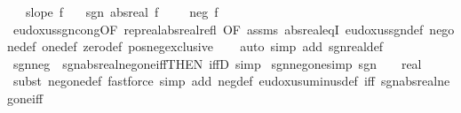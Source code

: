 \begin{isabellebody}
\ \ \ {\isachardoublequoteopen}slope\ f{\isachardoublequoteclose}\isanewline
\ \ \ {\isachardoublequoteopen}sgn\ {\isacharparenleft}{\kern0pt}abs{\isacharunderscore}{\kern0pt}real\ f{\isacharparenright}{\kern0pt}\ {\isacharequal}{\kern0pt}\ {\isacharminus}{\kern0pt}\ {}\ {\isasymlongleftrightarrow}\ neg\ f{\isachardoublequoteclose}\isanewline
%
\isadelimproof
\ \ %
\endisadelimproof
%
\isatagproof
{}\isamarkupfalse%
\ eudoxus{\isacharunderscore}{\kern0pt}sgn{\isacharunderscore}{\kern0pt}cong{\isacharbrackleft}{\kern0pt}OF\ rep{\isacharunderscore}{\kern0pt}real{\isacharunderscore}{\kern0pt}abs{\isacharunderscore}{\kern0pt}real{\isacharunderscore}{\kern0pt}refl{\isacharcomma}{\kern0pt}\ OF\ assms{\isacharbrackright}{\kern0pt}\ abs{\isacharunderscore}{\kern0pt}real{\isacharunderscore}{\kern0pt}eqI\ eudoxus{\isacharunderscore}{\kern0pt}sgn{\isacharunderscore}{\kern0pt}def\ neg{\isacharunderscore}{\kern0pt}one{\isacharunderscore}{\kern0pt}def\ one{\isacharunderscore}{\kern0pt}def\ zero{\isacharunderscore}{\kern0pt}def\ pos{\isacharunderscore}{\kern0pt}neg{\isacharunderscore}{\kern0pt}exclusive\isanewline
\ \ \isamarkupfalse%
\ {\isacharparenleft}{\kern0pt}auto\ simp\ add{\isacharcolon}{\kern0pt}\ sgn{\isacharunderscore}{\kern0pt}real{\isacharunderscore}{\kern0pt}def{\isacharparenright}{\kern0pt}%
\endisatagproof
{\isafoldproof}%
%
\isadelimproof
\isanewline
%
\endisadelimproof
\isanewline
{}\isamarkupfalse%
\ sgn{\isacharunderscore}{\kern0pt}neg\ {\isacharequal}{\kern0pt}\ sgn{\isacharunderscore}{\kern0pt}abs{\isacharunderscore}{\kern0pt}real{\isacharunderscore}{\kern0pt}neg{\isacharunderscore}{\kern0pt}one{\isacharunderscore}{\kern0pt}iff{\isacharbrackleft}{\kern0pt}THEN\ iffD{}{\isacharcomma}{\kern0pt}\ simp{\isacharbrackright}{\kern0pt}\isanewline
\isanewline
{}\isamarkupfalse%
\ sgn{\isacharunderscore}{\kern0pt}neg{\isacharunderscore}{\kern0pt}one{\isacharbrackleft}{\kern0pt}simp{\isacharbrackright}{\kern0pt}{\isacharcolon}{\kern0pt}\ {\isachardoublequoteopen}sgn\ {\isacharparenleft}{\kern0pt}{\isacharminus}{\kern0pt}\ {}\ {\isacharcolon}{\kern0pt}{\isacharcolon}{\kern0pt}\ real{\isacharparenright}{\kern0pt}\ {\isacharequal}{\kern0pt}\ {\isacharminus}{\kern0pt}\ {}{\isachardoublequoteclose}%
\isadelimproof
\ %
\endisadelimproof
%
\isatagproof
{}\isamarkupfalse%
\ {\isacharparenleft}{\kern0pt}subst\ neg{\isacharunderscore}{\kern0pt}one{\isacharunderscore}{\kern0pt}def{\isacharparenright}{\kern0pt}\ {\isacharparenleft}{\kern0pt}fastforce\ simp\ add{\isacharcolon}{\kern0pt}\ neg{\isacharunderscore}{\kern0pt}def\ eudoxus{\isacharunderscore}{\kern0pt}uminus{\isacharunderscore}{\kern0pt}def\ iff{\isacharcolon}{\kern0pt}\ sgn{\isacharunderscore}{\kern0pt}abs{\isacharunderscore}{\kern0pt}real{\isacharunderscore}{\kern0pt}neg{\isacharunderscore}{\kern0pt}one{\isacharunderscore}{\kern0pt}iff{\isacharparenright}{\kern0pt}%

\end{isabellebody}
